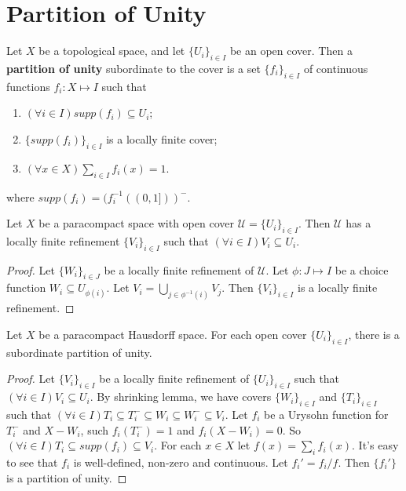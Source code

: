 \documentclass[12pt]{book}
\begin{document}
\section{Partition of Unity}
\begin{definition}
	Let $X$ be a topological space, and let $\{U_i\}_{i\in I}$ be an open cover. Then a {\bf partition of unity} subordinate to the cover is a set $\{f_i\}_{i\in I}$ of continuous functions $f_i:X\mapsto I$ such that 
	\begin{enumerate}
		\item $(\forall i\in I)supp(f_i)\subseteq U_i$;
		\item $\{supp(f_i)\}_{i\in I}$ is a locally finite cover;
		\item $(\forall x\in X)\sum_{i\in I}f_i(x)=1$.
	\end{enumerate}
	where $supp(f_i)=(f_i^{-1}((0,1]))^-$.
\end{definition}

\begin{lemma}
	Let $X$ be a paracompact space with open cover $\mathcal U=\{U_i\}_{i\in I}$. Then $\mathcal U$ has a locally finite refinement $\{V_i\}_{i\in I}$ such that $(\forall i\in I)V_i\subseteq U_i$.
\end{lemma}
\begin{proof}
	Let $\{W_i\}_{i\in J}$ be a locally finite refinement of $\mathcal U$. Let $\phi: J\mapsto I$ be a choice function $W_i\subseteq U_{\phi(i)}$. Let $V_i=\bigcup_{j\in\phi^{-1}(i)}V_j$. Then $\{V_i\}_{i\in I}$ is a locally finite refinement.
\end{proof}

\begin{lemma}
	Let $X$ be a paracompact Hausdorff space. For each open cover $\{U_i\}_{i\in I}$, there is a subordinate partition of unity.
\end{lemma}
\begin{proof}
	Let $\{V_i\}_{i\in I}$ be a locally finite refinement of $\{U_i\}_{i\in I}$ such that $(\forall i\in I)V_i\subseteq U_i$. By shrinking lemma, we have covers $\{W_i\}_{i\in I}$ and $\{T_i\}_{i\in I}$ such that $(\forall i\in I)T_i\subseteq T_i^-\subseteq W_i\subseteq W_i^-\subseteq V_i$. Let $f_i$ be a Urysohn function for $T_i^-$ and $X-W_i$, such $f_i(T_i^-)=1$ and $f_i(X-W_i)=0$. So $(\forall i\in I)T_i\subseteq supp(f_i)\subseteq V_i$. For each $x\in X$ let $f(x)=\sum_if_i(x)$. It's easy to see that $f_i$ is well-defined, non-zero and continuous. Let $f_i'=f_i/f$. Then $\{f_i'\}$ is a partition of unity.
\end{proof}
\end{document}
